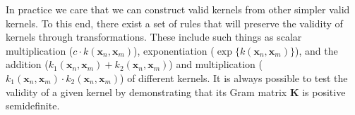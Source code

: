 
In practice we care that we can construct valid kernels from other simpler valid kernels. To this end, there exist a set of rules that will preserve the validity of kernels through transformations. These include such things as scalar multiplication \big($c \cdot k(\textbf{x}_{n}, \textbf{x}_{m})$\big), exponentiation \big($\exp{\{k(\textbf{x}_{n}, \textbf{x}_{m})\}}$\big), and the addition \big($k_{1}(\textbf{x}_{n}, \textbf{x}_{m}) + k_{2}(\textbf{x}_{n}, \textbf{x}_{m})$\big) and multiplication \big($k_{1}(\textbf{x}_{n}, \textbf{x}_{m}) \cdot k_{2}(\textbf{x}_{n}, \textbf{x}_{m})$\big) of different kernels. It is always possible to test the validity of a given kernel by demonstrating that its Gram matrix $\textbf{K}$ is positive semidefinite.
